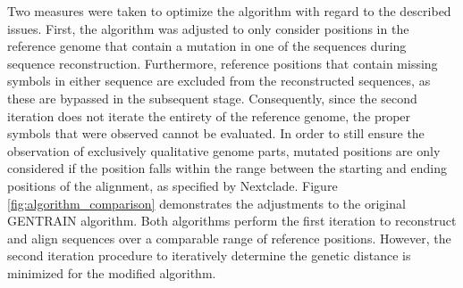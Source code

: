 Two measures were taken to optimize the algorithm with regard to the described issues. First, the algorithm was adjusted to only consider positions in the reference genome that contain a mutation in one of the sequences during sequence reconstruction. Furthermore, reference positions that contain missing symbols in either sequence are excluded from the reconstructed sequences, as these are bypassed in the subsequent stage. Consequently, since the second iteration does not iterate the entirety of the reference genome, the proper symbols that were observed cannot be evaluated. In order to still ensure the observation of exclusively qualitative genome parts, mutated positions are only considered if the position falls within the range between the starting and ending positions of the alignment, as specified by Nextclade. Figure \ref{fig:algorithm_comparison} demonstrates the adjustments to the original GENTRAIN algorithm. Both algorithms perform the first iteration to reconstruct and align sequences over a comparable range of reference positions. However, the second iteration procedure to iteratively determine the genetic distance is minimized for the modified algorithm.

